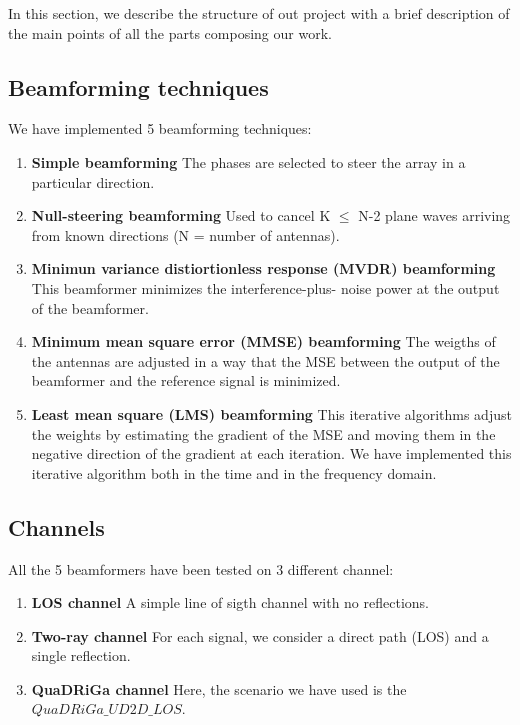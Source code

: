 In this section, we describe the structure of out project with a brief description of 
the main points of all the parts composing our work.

\subsection{Beamforming techniques}

We have implemented 5 beamforming techniques:

\begin{enumerate}
    \item \textbf{Simple beamforming} The phases are selected to steer the array in a particular direction.
    \item \textbf{Null-steering beamforming} Used to cancel K $\leq$ N-2 plane waves arriving from known directions (N = number of
                antennas).
    \item \textbf{Minimun variance distiortionless response (MVDR) beamforming} This beamformer minimizes the interference-plus-
            noise power at the output of the beamformer. 
    \item \textbf{Minimum mean square error (MMSE) beamforming} The weigths of the antennas are adjusted in a way that the
            MSE between the output of the beamformer and the reference signal is minimized.
    \item \textbf{Least mean square (LMS) beamforming} This iterative algorithms adjust the weights by estimating the
            gradient of the MSE and moving them in the negative direction of the gradient at each iteration. We have 
            implemented this iterative algorithm both in the time and in the frequency domain.
\end{enumerate}

\subsection{Channels}

All the 5 beamformers have been tested on 3 different channel:

\begin{enumerate}
    \item \textbf{LOS channel} A simple line of sigth channel with no reflections.
    \item \textbf{Two-ray channel} For each signal, we consider a direct path (LOS) and a single reflection.
    \item \textbf{QuaDRiGa channel} Here, the scenario we have used is the $QuaDRiGa\_UD2D\_LOS$.
\end{enumerate}

